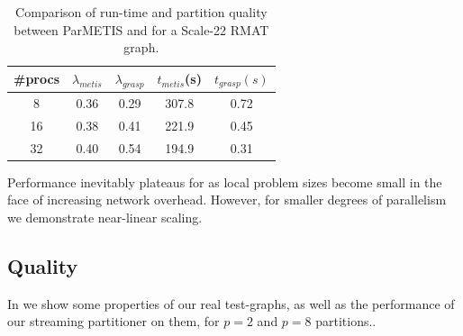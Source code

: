 \begin{table}
\caption{Comparison of run-time and partition quality between ParMETIS and \ourmethod for a Scale-22 RMAT graph.}
\centering
\small
{ \begin{tabular}{ c | c | c | c | c  }    \toprule
\#procs & $\lambda_{metis}$ & $\lambda_{grasp}$ & $t_{metis}$(s) & $t_{grasp}(s)$ \\ \midrule
8 & 0.36 & 0.29 & 307.8 & 0.72 \\
16 & 0.38 & 0.41 & 221.9 & 0.45 \\
32 & 0.40 & 0.54 & 194.9 & 0.31 \\
\hline
\end{tabular}\par
}
\label{tab:rmatpmstrong}
\end{table}


Performance inevitably plateaus for \ourmethod as local problem sizes become small in the face of increasing network overhead. However, for smaller degrees of parallelism we demonstrate near-linear scaling. 

\subsection{Quality} \label{sec:qual}
In  we show some properties of our real test-graphs, as well as the performance of our streaming partitioner on them, for $p=2$ and $p=8$ partitions.. 

